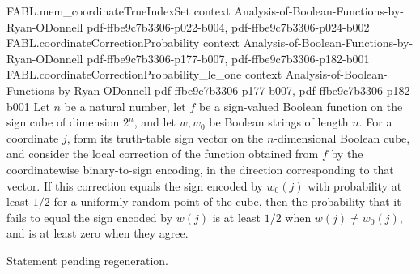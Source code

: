 \begin{theorem}
\proofstep
  {FABL.mem_coordinateTrueIndexSet}
  {context}
  {Analysis-of-Boolean-Functions-by-Ryan-ODonnell}
  {pdf-ffbe9c7b3306-p022-b004,
    pdf-ffbe9c7b3306-p024-b002}
\proofstep
  {FABL.coordinateCorrectionProbability}
  {context}
  {Analysis-of-Boolean-Functions-by-Ryan-ODonnell}
  {pdf-ffbe9c7b3306-p177-b007,
    pdf-ffbe9c7b3306-p182-b001}
\proofstep
  {FABL.coordinateCorrectionProbability_le_one}
  {context}
  {Analysis-of-Boolean-Functions-by-Ryan-ODonnell}
  {pdf-ffbe9c7b3306-p177-b007,
    pdf-ffbe9c7b3306-p182-b001}
Let $n$ be a natural number, let $f$ be a sign-valued Boolean function on the sign cube
of dimension $2^n$, and let $w,w_0$ be Boolean strings of length $n$. For a coordinate
$j$, form its truth-table sign vector on the $n$-dimensional Boolean cube, and consider
the local correction of the function obtained from $f$ by the coordinatewise
binary-to-sign encoding, in the direction corresponding to that vector. If this
correction equals the sign encoded by $w_0(j)$ with probability at least $1/2$ for a
uniformly random point of the cube, then the probability that it fails to equal the sign
encoded by $w(j)$ is at least $1/2$ when $w(j)\ne w_0(j)$, and is at least zero when
they agree.
\end{theorem}

\begin{theorem}
\label{FABL.half_relativeHammingDist_le_coordinateConsistency_rejection}
\leanok
{}
Statement pending regeneration.
\end{theorem}

